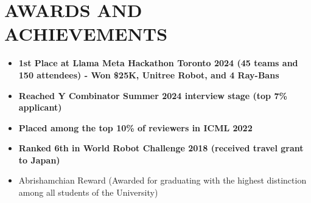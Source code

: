 \section{AWARDS AND ACHIEVEMENTS}
\begin{minipage}{\maincolumnwidth}%
	\small{
    	\begin{itemize}
            \item \textbf{1st Place at Llama Meta Hackathon Toronto 2024 (45 teams and 150 attendees) - Won \$25K, Unitree Robot, and 4 Ray-Bans}
            \item \textbf{Reached Y Combinator Summer 2024 interview stage (top 7\% applicant)}
                \item \textbf{Placed among the \textbf{top 10\% of reviewers} in ICML 2022}
    			\item \textbf{Ranked 6th in World Robot Challenge 2018 (received travel grant to Japan)}%
    	    \item {Abrishamchian Reward (Awarded for graduating with the highest distinction among all students of the University)}


\end{itemize}}
\end{minipage}
